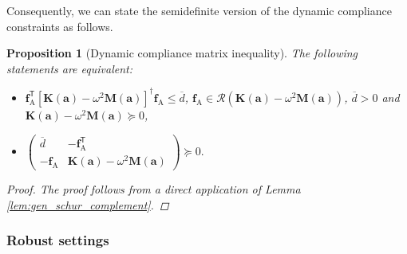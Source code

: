 \documentclass[preprint,3p]{elsarticle}
\newtheorem{proposition}{Proposition}
\newcommand{\T}{^{\mathsf T}}
\newcommand{\A}{\mathrm{A}}
\newcommand{\range}[1]{\ensuremath{\mathcal{R}\!\left(#1\right)}}
\numberwithin{equation}{section}
\begin{document}
Consequently, we can state the semidefinite version of the dynamic compliance constraints as follows.

\begin{proposition}[Dynamic compliance matrix inequality]\label{prop:dynamic_compliance}
  The following statements are equivalent:
  \begin{itemize}
    \item $\mathbf{f}_\A\T \left[ \mathbf{K}(\mathbf{a}) - \omega^2 \mathbf{M}(\mathbf{a})\right]^\dagger \mathbf{f}_\A \le \overline{d}$, $\mathbf{f}_\A \in \range{\mathbf{K}(\mathbf{a}) - \omega^2 \mathbf{M}(\mathbf{a})}$, $\overline{d}>0$ and $\mathbf{K}(\mathbf{a}) - \omega^2 \mathbf{M}(\mathbf{a})\succeq 0$,
    \item %
      $
      \begin{pmatrix}
        \overline{d} & - \mathbf{f}_\A\T\\
        -\mathbf{f}_\A & \mathbf{K}(\mathbf{a}) - \omega^2 \mathbf{M}(\mathbf{a})
      \end{pmatrix} \succeq 0.$
  \end{itemize}
  \begin{proof}
    The proof follows from a direct application of Lemma \ref{lem:gen_schur_complement}.
  \end{proof}
\end{proposition}

\subsubsection{Robust settings}\label{sec:dyncompl_robust}
\end{document}
